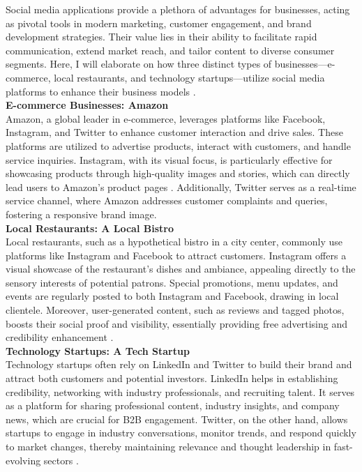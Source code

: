 \documentclass[12pt,a4paper]{article}
\begin{document}
Social media applications provide a plethora of advantages for businesses, acting as pivotal tools in modern marketing, customer engagement, and brand development strategies. Their value lies in their ability to facilitate rapid communication, extend market reach, and tailor content to diverse consumer segments. Here, I will elaborate on how three distinct types of businesses—e-commerce, local restaurants, and technology startups—utilize social media platforms to enhance their business models \citep{question_1.1}.\\

\noindent \textbf{E-commerce Businesses: Amazon}\\
Amazon, a global leader in e-commerce, leverages platforms like Facebook, Instagram, and Twitter to enhance customer interaction and drive sales. These platforms are utilized to advertise products, interact with customers, and handle service inquiries. Instagram, with its visual focus, is particularly effective for showcasing products through high-quality images and stories, which can directly lead users to Amazon’s product pages \citep{question_1.2}. Additionally, Twitter serves as a real-time service channel, where Amazon addresses customer complaints and queries, fostering a responsive brand image. \\

\noindent \textbf{Local Restaurants: A Local Bistro}\\
Local restaurants, such as a hypothetical bistro in a city center, commonly use platforms like Instagram and Facebook to attract customers. Instagram offers a visual showcase of the restaurant's dishes and ambiance, appealing directly to the sensory interests of potential patrons. Special promotions, menu updates, and events are regularly posted to both Instagram and Facebook, drawing in local clientele. Moreover, user-generated content, such as reviews and tagged photos, boosts their social proof and visibility, essentially providing free advertising and credibility enhancement \citep{question_1.3}. \\

\noindent \textbf{Technology Startups: A Tech Startup}\\
Technology startups often rely on LinkedIn and Twitter to build their brand and attract both customers and potential investors. LinkedIn helps in establishing credibility, networking with industry professionals, and recruiting talent. It serves as a platform for sharing professional content, industry insights, and company news, which are crucial for B2B engagement. Twitter, on the other hand, allows startups to engage in industry conversations, monitor trends, and respond quickly to market changes, thereby maintaining relevance and thought leadership in fast-evolving sectors \citep{question_1.4}.\\
\end{document}
